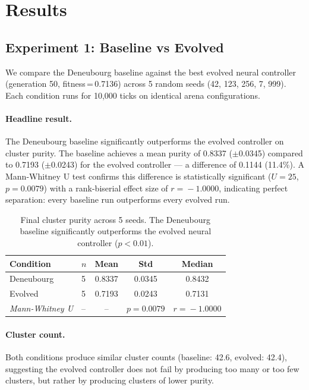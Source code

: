 \documentclass[11pt,a4paper]{article}
\begin{document}
\section{Results}
\label{sec:results}

\subsection{Experiment 1: Baseline vs Evolved}
\label{sec:results:main}

We compare the Deneubourg baseline against the best evolved neural controller (generation 50, fitness\,=\,0.7136) across 5 random seeds (42, 123, 256, 7, 999). Each condition runs for 10,000 ticks on identical arena configurations.

\paragraph{Headline result.} The Deneubourg baseline significantly outperforms the evolved controller on cluster purity. The baseline achieves a mean purity of 0.8337 ($\pm$0.0345) compared to 0.7193 ($\pm$0.0243) for the evolved controller --- a difference of 0.1144 (11.4\%). A Mann-Whitney U test confirms this difference is statistically significant ($U\!=\!25$, $p\!=\!0.0079$) with a rank-biserial effect size of $r\!=\!-1.0000$, indicating perfect separation: every baseline run outperforms every evolved run.

\begin{table}[H]
\centering
\begin{tabular}{llccc}
\toprule
Condition & $n$ & Mean & Std & Median \\
\midrule
Deneubourg & 5 & 0.8337 & 0.0345 & 0.8432 \\
Evolved & 5 & 0.7193 & 0.0243 & 0.7131 \\
\midrule
\textit{Mann-Whitney U} & -- & -- & $p\!=\!0.0079$ & $r\!=\!-1.0000$ \\
\bottomrule
\end{tabular}
\caption{Final cluster purity across 5 seeds. The Deneubourg baseline significantly outperforms the evolved neural controller ($p\!<\!0.01$).}
\label{tab:m5-results}
\end{table}

\paragraph{Cluster count.} Both conditions produce similar cluster counts (baseline: 42.6, evolved: 42.4), suggesting the evolved controller does not fail by producing too many or too few clusters, but rather by producing clusters of lower purity.
\end{document}
